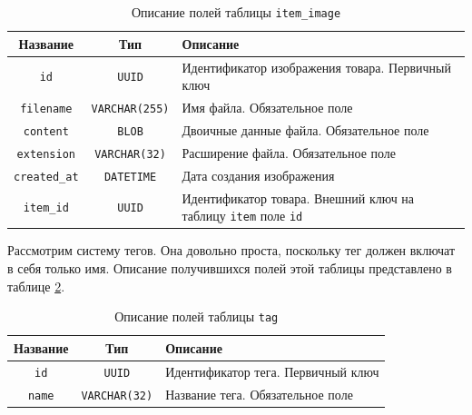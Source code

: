 \documentclass[a4paper,14pt]{extarticle}
\begin{document}
\begin{center}
    \begin{longtable}{|c|c|>{\centering\arraybackslash}m{10.5cm}|}
        \caption{Описание полей таблицы \texttt{item\_image}}
        \label{tab:item_image}
        \\
        \hline
        \textbf{Название}    & \textbf{Тип}          & \textbf{Описание}                                                            \\
        \hline
        \texttt{id}          & \texttt{UUID}         & Идентификатор изображения товара. Первичный ключ                             \\
        \hline
        \texttt{filename}    & \texttt{VARCHAR(255)} & Имя файла. Обязательное поле                                                 \\
        \hline
        \texttt{content}     & \texttt{BLOB}         & Двоичные данные файла. Обязательное поле                                     \\
        \hline
        \texttt{extension}   & \texttt{VARCHAR(32)}  & Расширение файла. Обязательное поле                                          \\
        \hline
        \texttt{created\_at} & \texttt{DATETIME}     & Дата создания изображения                                                    \\
        \hline
        \texttt{item\_id}    & \texttt{UUID}         & Идентификатор товара. Внешний ключ на таблицу \texttt{item} поле \texttt{id} \\
        \hline
    \end{longtable}
\end{center}

Рассмотрим систему тегов. Она довольно проста, поскольку тег должен включат в себя только имя. Описание получившихся полей этой таблицы представлено в таблице \ref{tab:tag}.

\begin{center}
    \begin{longtable}{|c|c|>{\centering\arraybackslash}m{10cm}|}
        \caption{Описание полей таблицы \texttt{tag}}
        \label{tab:tag}
        \\
        \hline
        \textbf{Название} & \textbf{Тип}         & \textbf{Описание}                  \\
        \hline
        \texttt{id}       & \texttt{UUID}        & Идентификатор тега. Первичный ключ \\
        \hline
        \texttt{name}     & \texttt{VARCHAR(32)} & Название тега. Обязательное поле   \\
        \hline
    \end{longtable}
\end{center}
\end{document}
